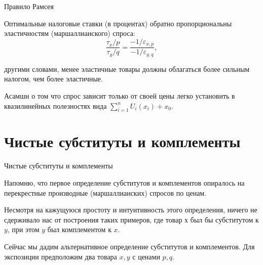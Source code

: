 \documentclass{beamer}
\begin{document}
%
%
%

\begin{frame}{Правило Рамсея}

\begin{lemma}
Оптимальные налоговые ставки (в процентах) обратно пропорциональны эластичностям (маршаллианского) спроса:
$$ \frac{\tau_x/p}{\tau_y/q} = \frac{-1/\varepsilon_{x,p}}{-1/\varepsilon_{y,q}},$$
\end{lemma}
другими словами, менее эластичные товары должны облагаться более сильным налогом, чем более эластичные.

Асамшн о том что спрос зависит только от своей цены легко установить в квазилинейных полезностях вида $\sum_{i=1}^n U_i(x_i) + x_0$.
\end{frame}

\section{Чистые субституты и комплементы}

\begin{frame}{Чистые субституты и комплементы}

Напомню, что первое определение субститутов и комплементов опиралось на перекрестные производные (маршаллианских) спросов по ценам. 

Несмотря на кажущуюся простоту и интуитивность этого определения, ничего не сдерживало нас от построения таких примеров, где товар $х$ был бы субститутом к $y$, при этом $y$ был комплементом к $x$.

Сейчас мы дадим альтернативное определение субститутов и комплементов. Для экспозиции предположим два товара $x,y$ с ценами $p,q$.
\end{frame}
\end{document}
